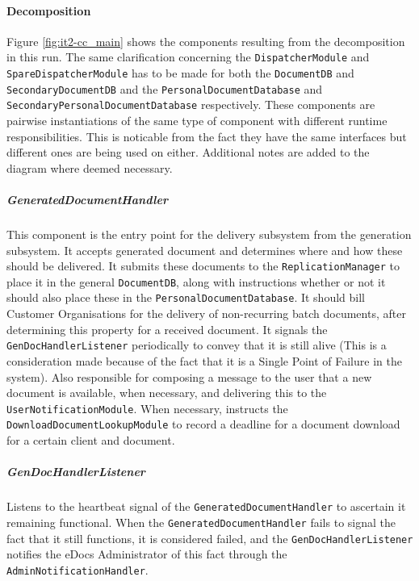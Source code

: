 \documentclass[a4paper,10pt]{article}
\begin{document}
\paragraph{Decomposition}
Figure \ref{fig:it2-cc_main} shows the components resulting from the decomposition in this run. The same clarification concerning the \texttt{DispatcherModule} and \texttt{SpareDispatcherModule} has to be made for both the \texttt{DocumentDB} and \texttt{SecondaryDocumentDB} and the \texttt{PersonalDocumentDatabase} and \texttt{SecondaryPersonalDocumentDatabase} respectively. These components are pairwise instantiations of the same type of component with different runtime responsibilities. This is noticable from the fact they have the same interfaces but different ones are being used on either. Additional notes are added to the diagram where deemed necessary.

\subparagraph{GeneratedDocumentHandler}
This component is the entry point for the delivery subsystem from the generation subsystem. It accepts generated document and determines where and how these should be delivered. It submits these documents to the \texttt{ReplicationManager} to place it in the general \texttt{DocumentDB}, along with instructions whether or not it should also place these in the \texttt{PersonalDocumentDatabase}. It should bill Customer Organisations for the delivery of non-recurring batch documents, after determining this property for a received document. It signals the \texttt{GenDocHandlerListener} periodically to convey that it is still alive (This is a consideration made because of the fact that it is a Single Point of Failure in the system). Also responsible for composing a message to the user that a new document is available, when necessary, and delivering this to the \texttt{UserNotificationModule}. When necessary, instructs the \texttt{DownloadDocumentLookupModule} to record a deadline for a document download for a certain client and document.

\subparagraph{GenDocHandlerListener}
Listens to the heartbeat signal of the \texttt{GeneratedDocumentHandler} to ascertain it remaining functional. When the \texttt{GeneratedDocumentHandler} fails to signal the fact that it still functions, it is considered failed, and the \texttt{GenDocHandlerListener} notifies the eDocs Administrator of this fact through the \texttt{AdminNotificationHandler}.
\end{document}
